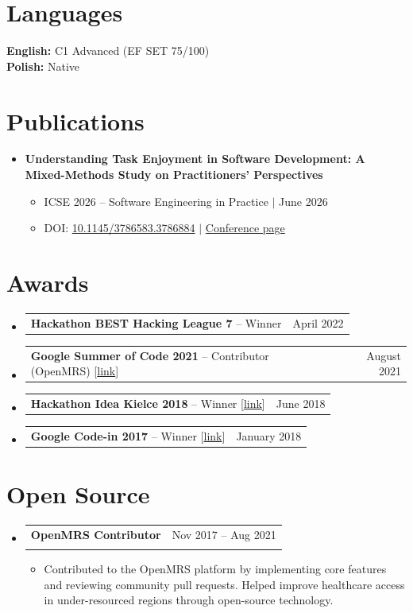 \documentclass[letterpaper,11pt]{article}
\makeatletter
\newcommand{\resumeItem}[1]{
  \item\small{#1 \vspace{-2pt}}
}
\newcommand{\resumeSubheading}[4]{
  \vspace{-2pt}\item
    \begin{tabular*}{0.97\textwidth}[t]{l@{\extracolsep{\fill}}r}
      \textbf{#1} & #2 \\
      \textit{\small#3} & \textit{\small #4} \\
    \end{tabular*}\vspace{-7pt}
}
\newcommand{\resumeProjectHeading}[2]{
    \item
    \begin{tabular*}{0.97\textwidth}{l@{\extracolsep{\fill}}r}
      \small#1 & #2 \\
    \end{tabular*}\vspace{-7pt}
}
\newcommand{\resumeSubHeadingListStart}{\begin{itemize}[leftmargin=0.15in, label={}]}
\newcommand{\resumeSubHeadingListEnd}{\end{itemize}}
\newcommand{\resumeItemListStart}{\begin{itemize}}
\newcommand{\resumeItemListEnd}{\end{itemize}\vspace{-5pt}}
\makeatother
\begin{document}

\section{Languages}
  \begin{itemize}[leftmargin=0.15in, label={}]
    \small{\item{
      \textbf{English:} C1 Advanced (EF SET 75/100) \\
      \textbf{Polish:} Native \\
    }}
  \end{itemize}


\section{Publications}
  \resumeSubHeadingListStart
    \item \textbf{Understanding Task Enjoyment in Software Development: A Mixed-Methods Study on Practitioners' Perspectives}
      \resumeItemListStart
        \resumeItem{ICSE 2026 -- Software Engineering in Practice $|$ June 2026}
        \resumeItem{DOI: \href{https://doi.org/10.1145/3786583.3786884}{10.1145/3786583.3786884} $|$ \href{https://conf.researchr.org/details/icse-2026/icse-2026-software-engineering-in-practice/31/Understanding-Task-Enjoyment-in-Software-Development-A-Mixed-Methods-Study-on-Practi}{Conference page}}
      \resumeItemListEnd
  \resumeSubHeadingListEnd


\section{Awards}
  \resumeSubHeadingListStart
    \resumeProjectHeading{\textbf{Hackathon BEST Hacking League 7} -- Winner}{April 2022}
    \resumeProjectHeading{\textbf{Google Summer of Code 2021} -- Contributor (OpenMRS) [\href{https://summerofcode.withgoogle.com/archive/2021/projects/6109064345419776}{link}]}{August 2021}
    \resumeProjectHeading{\textbf{Hackathon Idea Kielce 2018} -- Winner [\href{https://smartcity.kielce.eu/smart-city-kielce-hackathon.html}{link}]}{June 2018}
    \resumeProjectHeading{\textbf{Google Code-in 2017} -- Winner [\href{https://link.rasztabiga.me/googlecodein}{link}]}{January 2018}
  \resumeSubHeadingListEnd


\section{Open Source}
  \resumeSubHeadingListStart
    \resumeSubheading
      {OpenMRS Contributor}{Nov 2017 -- Aug 2021}{}{}
      \resumeItemListStart
        \resumeItem{Contributed to the OpenMRS platform by implementing core features and reviewing community pull requests. Helped improve healthcare access in under-resourced regions through open-source technology.}
      \resumeItemListEnd
  \resumeSubHeadingListEnd
\end{document}

